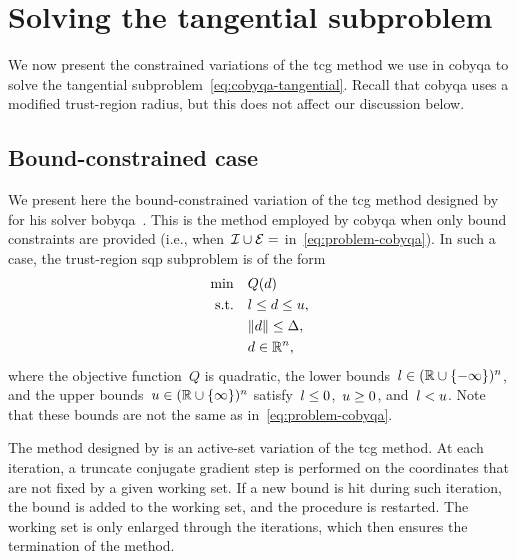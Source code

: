 \section{Solving the tangential subproblem}
\label{sec:cobyqa-tangential}

We now present the constrained variations of the \gls{tcg} method we use in \gls{cobyqa} to solve the tangential subproblem~\cref{eq:cobyqa-tangential}.
Recall that \gls{cobyqa} uses a modified trust-region radius, but this does not affect our discussion below.

\subsection{Bound-constrained case}

We present here the bound-constrained variation of the \gls{tcg} method designed by \citeauthor{Powell_2009} for his solver \gls{bobyqa}~\cite{Powell_2009}.
This is the method employed by \gls{cobyqa} when only bound constraints are provided (i.e., when~$\iub \cup \ieq = \empty$ in~\cref{eq:problem-cobyqa}).
In such a case, the trust-region \gls{sqp} subproblem is of the form
\begin{subequations}
    \label{eq:problem-tcg-bounds}
    \begin{align}
        \min        & \quad Q(\step) \label{eq:problem-tcg-bounds-obj}\\
        \text{s.t.} & \quad \xl \le \step \le \xu,\\
                    & \quad \norm{\step} \le \rad,\\
                    & \quad \step \in \R^n, \nonumber
    \end{align}
\end{subequations}
where the objective function~$Q$ is quadratic, the lower bounds~$l \in (\mathbb{R} \cup \{-\infty\})^n$, and the upper bounds~$u \in (\mathbb{R} \cup \{\infty\})^n$ satisfy~$l \le 0$,~$u \ge 0$, and~$l < u$.
Note that these bounds are not the same as in~\cref{eq:problem-cobyqa}.

The method designed by \citeauthor{Powell_2009} is an active-set variation of the \gls{tcg} method.
At each iteration, a truncate conjugate gradient step is performed on the coordinates that are not fixed by a given working set.
If a new bound is hit during such iteration, the bound is added to the working set, and the procedure is restarted.
The working set is only enlarged through the iterations, which then ensures the termination of the method.


